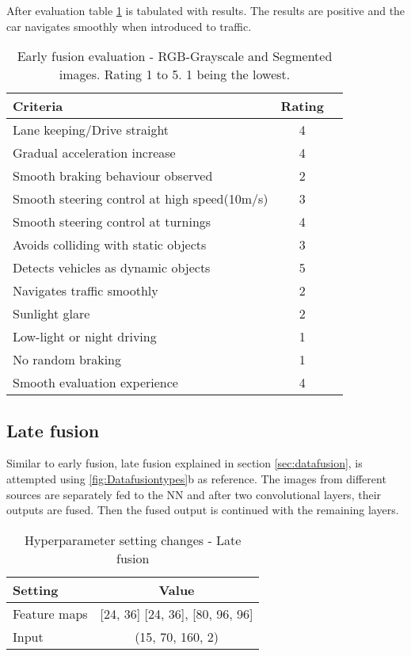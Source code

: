 After evaluation table \ref{table:earlyfusionrgbseg} is tabulated with results. The
results are positive and the car navigates smoothly when introduced to traffic.
\begin{table}[!ht]
    \centering
\begin{tabular}{lcc}
    \toprule
    Criteria & Rating \\\midrule
    Lane keeping/Drive straight  & 4  \\
    Gradual acceleration increase  & 4\\
    Smooth braking behaviour observed & 2 \\
    Smooth steering control at high speed(10m/s) & 3 \\
    Smooth steering control at turnings & 4\\
    Avoids colliding with static objects & 3 \\
    Detects vehicles as dynamic objects & 5 \\
    Navigates traffic smoothly & 2\\
    Sunlight glare & {2} \\
    Low-light or night driving & {1} \\
    No random braking & 1 \\
    Smooth evaluation experience & 4 \\\bottomrule
\end{tabular}
\caption{Early fusion evaluation - RGB-Grayscale and Segmented images. Rating 1 to 5. 1
being the lowest.}
\label{table:earlyfusionrgbseg}
\end{table}

\subsection{Late fusion}
Similar to early fusion, late fusion explained in section \ref{sec:datafusion}, is attempted
using \ref{fig:Datafusiontypes}b as reference. The images from different sources
are separately fed to the NN and after two convolutional layers,
their outputs are fused. Then the fused output is continued with the remaining layers.
\begin{table}[!ht]
    \centering
\begin{tabular}{lc}
    \toprule
    Setting  & Value  \\\midrule
    Feature maps  & [24, 36] [24, 36], [80, 96, 96]  \\
    Input  & (15, 70, 160, 2)\\\bottomrule
\end{tabular}
\caption{Hyperparameter setting changes - Late fusion}
\label{table:paramsLF}
\end{table}

